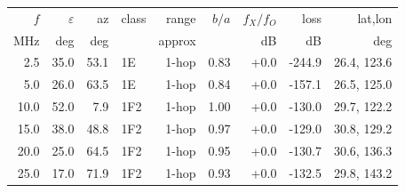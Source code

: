 \begin{tabular}{rrrlrrrrr}
\toprule
$f$ & $\varepsilon$ & az & class & range & $b/a$ & $f_X/f_O$ & loss & lat,lon \\
MHz & deg & deg & & approx & & dB & dB & deg \\
\midrule
2.5 & 35.0 & 53.1 & 1E & 1-hop & 0.83 & +0.0 & -244.9 & 26.4, 123.6 \\
5.0 & 26.0 & 63.5 & 1E & 1-hop & 0.84 & +0.0 & -157.1 & 26.5, 125.0 \\
10.0 & 52.0 & 7.9 & 1F2 & 1-hop & 1.00 & +0.0 & -130.0 & 29.7, 122.2 \\
15.0 & 38.0 & 48.8 & 1F2 & 1-hop & 0.97 & +0.0 & -129.0 & 30.8, 129.2 \\
20.0 & 25.0 & 64.5 & 1F2 & 1-hop & 0.95 & +0.0 & -130.7 & 30.6, 136.3 \\
25.0 & 17.0 & 71.9 & 1F2 & 1-hop & 0.93 & +0.0 & -132.5 & 29.8, 143.2 \\
\bottomrule
\end{tabular}

